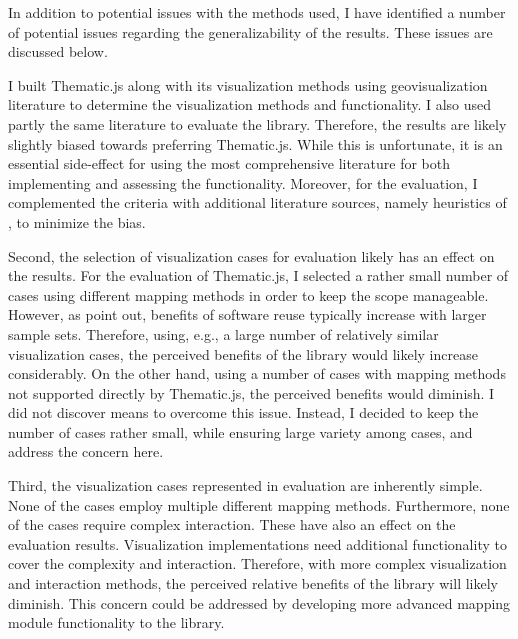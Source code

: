 In addition to potential issues with the methods used, I have identified a number of potential issues regarding the generalizability of the results. These issues are discussed below.

I built Thematic.js along with its visualization methods using geovisualization literature to determine the visualization methods and functionality. I also used partly the same literature to evaluate the library. Therefore, the results are likely slightly biased towards preferring Thematic.js. While this is unfortunate, it is an essential side-effect for using the most comprehensive literature for both implementing and assessing the functionality. Moreover, for the evaluation, I complemented the criteria with additional literature sources, namely heuristics of \citet{zuk_heuristics_2006}, to minimize the bias.

Second, the selection of visualization cases for evaluation likely has an effect on the results. For the evaluation of Thematic.js, I selected a rather small number of cases using different mapping methods in order to keep the scope manageable. However, as \citet{frakes_success_1994} point out, benefits of software reuse typically increase with larger sample sets. Therefore, using, e.g., a large number of relatively similar visualization cases, the perceived benefits of the library would likely increase considerably. On the other hand, using a number of cases with mapping methods not supported directly by Thematic.js, the perceived benefits would diminish. I did not discover means to overcome this issue. Instead, I decided to keep the number of cases rather small, while ensuring large variety among cases, and address the concern here.

Third, the visualization cases represented in evaluation are inherently simple. None of the cases employ multiple different mapping methods. Furthermore, none of the cases require complex interaction. These have also an effect on the evaluation results. Visualization implementations need additional functionality to cover the complexity and interaction. Therefore, with more complex visualization and interaction methods, the perceived relative benefits of the library will likely diminish. This concern could be addressed by developing more advanced mapping module functionality to the library.


